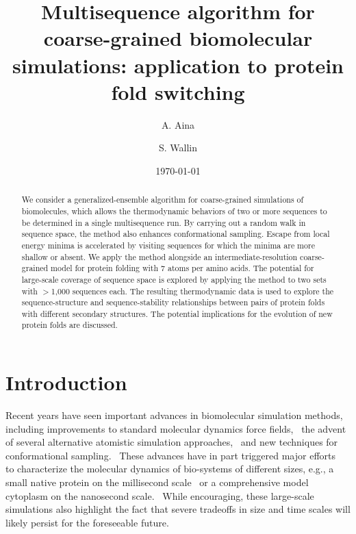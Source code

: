 \documentclass[
aip,
rsi,%
amsmath,amssymb,
reprint,%
]{revtex4-1}
\begin{document}

\title[Multisequence Monte Carlo simulations]{Multisequence algorithm for coarse-grained biomolecular simulations: application to protein fold switching}

\author{A. Aina}
\author{S. Wallin}

\date{\today}

\begin{abstract}

We consider a generalized-ensemble algorithm for coarse-grained simulations of biomolecules, which allows the thermodynamic behaviors of two or more sequences to be determined in a single multisequence run. By carrying out a random walk in sequence space, the method also enhances conformational sampling. Escape from local energy minima is accelerated by visiting sequences for which the minima are more shallow or absent. We apply the method alongside an intermediate-resolution coarse-grained model for protein folding with 7 atoms per amino acids. The potential for large-scale coverage of sequence space is explored by applying the method to two sets with $>$1,000 sequences each. The resulting thermodynamic data is used to explore the sequence-structure and sequence-stability relationships between pairs of protein folds with different secondary structures. The potential implications for the evolution of new protein folds are discussed. 

 
\end{abstract}

                             


\maketitle

\section{Introduction}
\noindent
Recent years have seen important advances in biomolecular simulation methods, including improvements to standard molecular dynamics force fields,~\cite{Piana2014} the advent of several alternative atomistic simulation approaches,~\cite{Ding2008,Irback2006,Verma2009,Yang2007} and new techniques for  conformational sampling.~\cite{Bernardi2015} These advances have in part triggered major efforts~\cite{McGuffee2010,Perilla2016,Lindorff-Larsen2011,Yu2016} to characterize the molecular dynamics of bio-systems of different sizes, e.g., a small native protein on the millisecond scale~\cite{Lindorff-Larsen2011} or a comprehensive model cytoplasm on the nanosecond scale.~\cite{Yu2016} While encouraging, these large-scale simulations also highlight the fact that severe tradeoffs in size and time scales will likely persist for the foreseeable future. 
\end{document}
